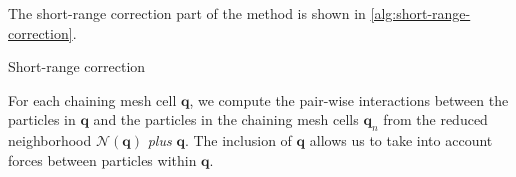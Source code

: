 The short-range correction part of the \PThreeM{} method is shown in \autoref{alg:short-range-correction}.
\begin{algorithm}
    \caption{Short-range correction}\label{alg:short-range-correction}
    \begin{algorithmic}[1]
        \Break
        \EndIf
        \State {}
        \EndFor
        \EndFor
        \EndFor
        \EndFor
    \end{algorithmic}
\end{algorithm}
For each chaining mesh cell $\mathbf{q}$, we compute the pair-wise interactions between the particles in $\mathbf{q}$ and the particles in the chaining mesh cells $\mathbf{q}_n$ from the reduced neighborhood $\mathcal{N}(\mathbf{q})$ \textit{plus} $\mathbf{q}$.
The inclusion of $\mathbf{q}$ allows us to take into account forces between particles within $\mathbf{q}$.

